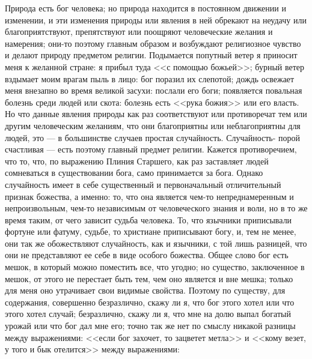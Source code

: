 \documentclass[12pt]{article}
\begin{document}
Природа есть бог человека; но природа находится в постоянном движении и изменении, и эти изменения природы или явления в ней обрекают на неудачу или благоприятствуют, препятствуют или поощряют человеческие желания и намерения; они-то поэтому главным образом и возбуждают религиозное чувство и делают природу предметом религии. Подымается попутный ветер я приносит меня к желанной стране: я прибыл туда <<с помощью божьей>>; бурный ветер вздымает моим врагам пыль в лицо: бог поразил их слепотой; дождь освежает меня внезапно во время великой засухи: послали его боги; появляется повальная болезнь среди людей или скота: болезнь есть <<рука божия>>  или его власть. Но что данные явления природы как раз соответствуют или противоречат тем или другим человеческим желаниям, что они благоприятны или неблагоприятны для людей, это --- в большинстве случаев простая случайность. Случайность- порой счастливая --- есть поэтому главный предмет религии. Кажется противоречием, что то, что, по выражению Плиния Старшего, как раз заставляет людей сомневаться в существовании бога, само принимается за бога. Однако случайность имеет в себе существенный и первоначальный отличительный признак божества, а именно: то, что она является чем-то непреднамеренным и непроизвольным, чем-то независимым от человеческого знания и воли, но в то же время таким, от чего зависит судьба человека. То, что язычники приписывали фортуне или фатуму, судьбе, то христиане приписывают богу, и, тем не менее, они так же обожествляют случайность, как и язычники, с той лишь разницей, что они не представляют ее себе в виде особого божества. Общее слово бог есть мешок, в который можно поместить все, что угодно; но существо, заключенное в мешок, от этого не перестает быть тем, чем оно является и вне мешка; только для меня оно утрачивает свои видимые свойства. Поэтому по существу, для содержания, совершенно безразлично, скажу ли я, что бог этого хотел или что этого хотел случай; безразлично, скажу ли я, что мне на долю выпал богатый урожай или что бог дал мне его; точно так же нет по смыслу никакой разницы между выражениями: <<если бог захочет, то зацветет метла>> и <<кому везет, у того и бык отелится>>  между выражениями: 
\end{document}
